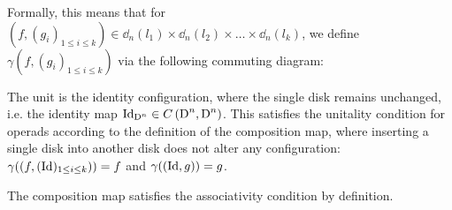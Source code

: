 \begin{egs}
\begin{enumerate}
\begin{center}
            \end{center}
            
            Formally, this means that for $(f, (g_i)_{1 \leq i \leq k}) \in
            \dd_n(l_1) \times \dd_n(l_2) \times \dots \times \dd_n(l_k)$, we
            define $\gamma(f, (g_i)_{1 \leq i \leq k})$ via the following
            commuting diagram:

            \begin{center}
            \end{center}

            The unit is the identity configuration, where the single disk
            remains unchanged, i.e. the identity map $\operatorname{Id}_{\operatorname{D}^n} \in
            C\left(\operatorname{D}^n, \operatorname{D}^n\right)$. This satisfies the unitality condition
            for operads according to the definition of the composition map,
            where inserting a single disk into another disk does not alter any
            configuration: $\gamma((f, (\operatorname{Id})_{1 \leq i \leq k})) = f$ and
            $\gamma((\operatorname{Id}, g)) = g$.
            
            The composition map satisfies the associativity condition by
            definition.


\end{enumerate}
\end{egs}
